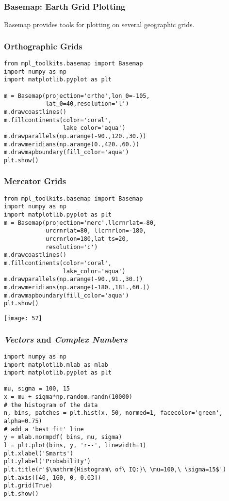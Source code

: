 \begin{frame}[fragile]\frametitle{Basemap: Earth Grid Plotting}

    Basemap provides tools for plotting on several geographic grids.
\end{frame}

\begin{frame}[fragile]\frametitle{Orthographic Grids}
    \begin{lstlisting}
from mpl_toolkits.basemap import Basemap
import numpy as np
import matplotlib.pyplot as plt

m = Basemap(projection='ortho',lon_0=-105,
            lat_0=40,resolution='l')
m.drawcoastlines()
m.fillcontinents(color='coral',
                 lake_color='aqua')
m.drawparallels(np.arange(-90.,120.,30.))
m.drawmeridians(np.arange(0.,420.,60.))
m.drawmapboundary(fill_color='aqua')
plt.show()
    \end{lstlisting}
\end{frame}

\begin{frame}[fragile]\frametitle{Mercator Grids}
    \begin{lstlisting}
from mpl_toolkits.basemap import Basemap
import numpy as np
import matplotlib.pyplot as plt
m = Basemap(projection='merc',llcrnrlat=-80,
            urcrnrlat=80, llcrnrlon=-180,
            urcrnrlon=180,lat_ts=20,
            resolution='c')
m.drawcoastlines()
m.fillcontinents(color='coral',
                 lake_color='aqua')
m.drawparallels(np.arange(-90.,91.,30.))
m.drawmeridians(np.arange(-180.,181.,60.))
m.drawmapboundary(fill_color='aqua')
plt.show()
    \end{lstlisting}
\begin{center}
\texttt{[image: 57]}
\end{center}
\end{frame}


\begin{frame}[fragile]\frametitle{\emph{Vectors} and \emph{Complex Numbers}}

\begin{lstlisting}
import numpy as np
import matplotlib.mlab as mlab
import matplotlib.pyplot as plt

mu, sigma = 100, 15
x = mu + sigma*np.random.randn(10000)
# the histogram of the data
n, bins, patches = plt.hist(x, 50, normed=1, facecolor='green', 
alpha=0.75)
# add a 'best fit' line
y = mlab.normpdf( bins, mu, sigma)
l = plt.plot(bins, y, 'r--', linewidth=1)
plt.xlabel('Smarts')
plt.ylabel('Probability')
plt.title(r'$\mathrm{Histogram\ of\ IQ:}\ \mu=100,\ \sigma=15$')
plt.axis([40, 160, 0, 0.03])
plt.grid(True)
plt.show()
\end{lstlisting}

\end{frame}

